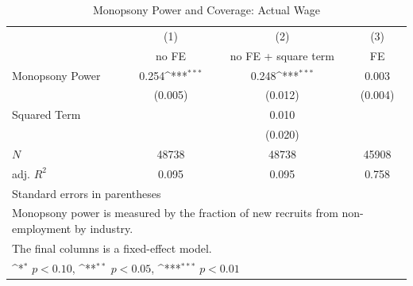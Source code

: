 \begin{table}[htbp]\centering
\def\sym#1{\ifmmode^{#1}\else\(^{#1}\)\fi}
\caption{Monopsony Power and Coverage: Actual Wage}
\begin{tabular}{l*{3}{c}}
\hline\hline
            &\multicolumn{1}{c}{(1)}&\multicolumn{1}{c}{(2)}&\multicolumn{1}{c}{(3)}\\
            &\multicolumn{1}{c}{no FE}&\multicolumn{1}{c}{no FE + square term}&\multicolumn{1}{c}{FE}\\
\hline
Monopsony Power&       0.254\sym{***}&       0.248\sym{***}&       0.003         \\
            &     (0.005)         &     (0.012)         &     (0.004)         \\
[1em]
Squared Term&                     &       0.010         &                     \\
            &                     &     (0.020)         &                     \\
\hline
\(N\)       &       48738         &       48738         &       45908         \\
adj. \(R^{2}\)&       0.095         &       0.095         &       0.758         \\
\hline\hline
\multicolumn{4}{l}{\footnotesize Standard errors in parentheses}\\
\multicolumn{4}{l}{\footnotesize Monopsony power is measured by the fraction of new recruits from non-employment by industry.}\\
\multicolumn{4}{l}{\footnotesize The final columns is a fixed-effect model.}\\
\multicolumn{4}{l}{\footnotesize \sym{*} \(p<0.10\), \sym{**} \(p<0.05\), \sym{***} \(p<0.01\)}\\
\end{tabular}
\end{table}

